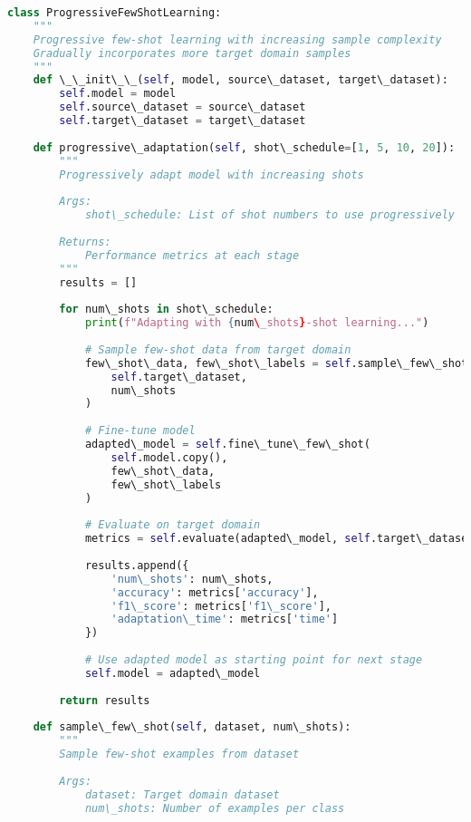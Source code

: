 \documentclass[journal]{IEEEtran}
\begin{document}
\begin{lstlisting}[language=Python, caption=Progressive Few-Shot Learning Strategy]
class ProgressiveFewShotLearning:
    """
    Progressive few-shot learning with increasing sample complexity
    Gradually incorporates more target domain samples
    """
    def \_\_init\_\_(self, model, source\_dataset, target\_dataset):
        self.model = model
        self.source\_dataset = source\_dataset
        self.target\_dataset = target\_dataset
        
    def progressive\_adaptation(self, shot\_schedule=[1, 5, 10, 20]):
        """
        Progressively adapt model with increasing shots
        
        Args:
            shot\_schedule: List of shot numbers to use progressively
        
        Returns:
            Performance metrics at each stage
        """
        results = []
        
        for num\_shots in shot\_schedule:
            print(f"Adapting with {num\_shots}-shot learning...")
            
            # Sample few-shot data from target domain
            few\_shot\_data, few\_shot\_labels = self.sample\_few\_shot(
                self.target\_dataset, 
                num\_shots
            )
            
            # Fine-tune model
            adapted\_model = self.fine\_tune\_few\_shot(
                self.model.copy(),
                few\_shot\_data,
                few\_shot\_labels
            )
            
            # Evaluate on target domain
            metrics = self.evaluate(adapted\_model, self.target\_dataset)
            
            results.append({
                'num\_shots': num\_shots,
                'accuracy': metrics['accuracy'],
                'f1\_score': metrics['f1\_score'],
                'adaptation\_time': metrics['time']
            })
            
            # Use adapted model as starting point for next stage
            self.model = adapted\_model
        
        return results
    
    def sample\_few\_shot(self, dataset, num\_shots):
        """
        Sample few-shot examples from dataset
        
        Args:
            dataset: Target domain dataset
            num\_shots: Number of examples per class
        

\end{lstlisting}
\end{document}
